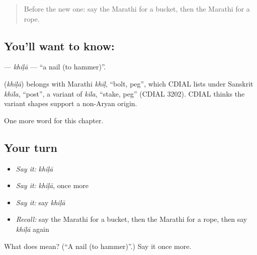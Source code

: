 \begin{quote}
Before the new one: say the Marathi for a bucket, then the Marathi for a rope.
\end{quote}

\subsection*{You'll want to know: }
\textbf{} — \emph{khiḷā} — \textquotedblleft{}a nail (to hammer)\textquotedblright{}.

\begin{cousinweb}
\textbf{} (\emph{khiḷā}) belongs with Marathi \emph{khīḷ}, \textquotedblleft{}bolt, peg\textquotedblright{}, which CDIAL lists under Sanskrit \emph{khīla}, \textquotedblleft{}post\textquotedblright{}, a variant of \emph{kīla}, \textquotedblleft{}stake, peg\textquotedblright{} (CDIAL 3202). CDIAL thinks the variant shapes support a non-Aryan origin.
\end{cousinweb}

\begin{grammarlens}[title={What you've built}]
One more word for this chapter.
\end{grammarlens}

\subsection*{Your turn}
\begin{itemize}
\raggedright
  \item \emph{Say it:} \emph{khiḷā}
  \item \emph{Say it:} \emph{khiḷā}, once more
  \item \emph{Say it:} say \emph{khiḷā}
  \item \emph{Recall:} say the Marathi for a bucket, then the Marathi for a rope, then say \emph{khiḷā} again
\end{itemize}

\begin{tcolorbox}[breakable,colback=teal!4,colframe=teal!35!black,title={Before you move on}]
What does  mean? (\textquotedblleft{}A nail (to hammer)\textquotedblright{}.) Say it once more.
\end{tcolorbox}
